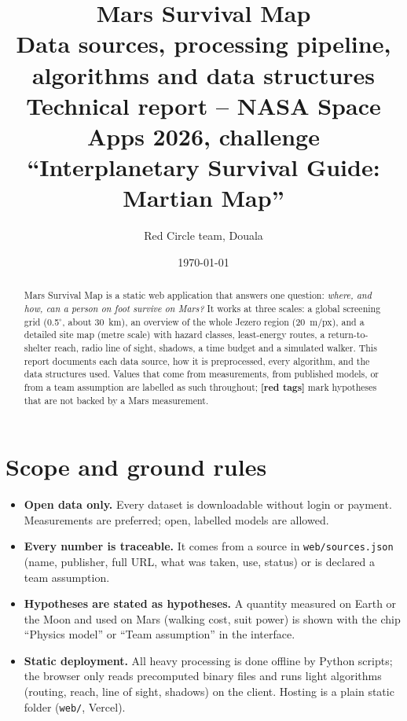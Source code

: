 \documentclass[11pt,a4paper]{article}
\title{\textbf{Mars Survival Map}\\[2pt]\large Data sources, processing pipeline, algorithms and data structures\\[2pt]\normalsize Technical report -- NASA Space Apps 2026, challenge ``Interplanetary Survival Guide: Martian Map''}
\author{Red Circle team, Douala}
\date{\today}
\newcommand{\hyp}[1]{\textcolor{marsred}{\textbf{[#1]}}}   %
\renewcommand{\_}{\textunderscore\allowbreak}
\newcommand{\code}[1]{\texttt{#1}}
\begin{document}
\maketitle
\begin{abstract}\noindent
Mars Survival Map is a static web application that answers one question: \emph{where, and how, can a person on foot survive on Mars?}
It works at three scales: a global screening grid (0.5$^\circ$, about 30~km), an overview of the whole Jezero region (20~m/px), and a detailed site map (metre scale)
with hazard classes, least-energy routes, a return-to-shelter reach, radio line of sight, shadows, a time budget and a simulated walker.
This report documents each data source, how it is preprocessed, every algorithm, and the data structures used. Values that come from measurements,
from published models, or from a team assumption are labelled as such throughout; \hyp{red tags} mark hypotheses that are not backed by a Mars measurement.
\end{abstract}
\tableofcontents

\section{Scope and ground rules}
\begin{itemize}
\item \textbf{Open data only.} Every dataset is downloadable without login or payment. Measurements are preferred; open, labelled models are allowed.
\item \textbf{Every number is traceable.} It comes from a source in \code{web/sources.json} (name, publisher, full URL, what was taken, use, status) or is declared a team assumption.
\item \textbf{Hypotheses are stated as hypotheses.} A quantity measured on Earth or the Moon and used on Mars (walking cost, suit power) is shown with the chip ``Physics model'' or ``Team assumption'' in the interface.
\item \textbf{Static deployment.} All heavy processing is done offline by Python scripts; the browser only reads precomputed binary files and runs light algorithms (routing, reach, line of sight, shadows) on the client. Hosting is a plain static folder (\code{web/}, Vercel).
\end{itemize}

\end{document}
